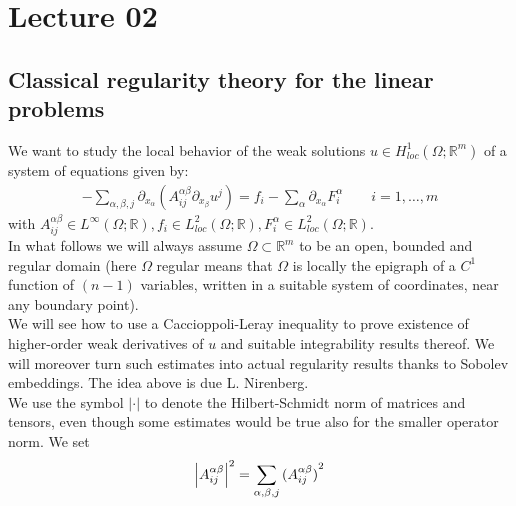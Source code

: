 \chapter{Lecture 02}

\section{Classical regularity theory for the linear problems}
We want to study the local behavior of the weak solutions \(u \in H_{loc}^{1}(\Omega; \mathbb{R}^{m})\) of a system of equations given by:
\begin{gather}
	- \sum_{\alpha, \beta, j} \partial_{x_\alpha} (A_{ij}^{\alpha \beta} \partial_{x_{\beta}} u^{j}) = f_{i} - \sum_{\alpha}^{} \partial_{x_{\alpha}} F_{i}^{\alpha}\qquad i=1,\dots,m
\end{gather}
with \(A_{ij}^{\alpha \beta} \in L^{\infty}(\Omega;\mathbb{R}), f_{i}\in L^{2}_{loc}(\Omega;\mathbb{R}), F_{i}^{\alpha}\in L_{loc}^{2}(\Omega;\mathbb{R})\).\\
In what follows we will always assume \(\Omega \subset \mathbb{R}^{m}\) to be an open, bounded and regular domain (here \(\Omega \) regular means that \(\Omega \) is locally the epigraph of a \(C^{1}\) function of \((n-1)\) variables, written in a suitable system of coordinates, near any boundary point).\\
We will see how to use a Caccioppoli-Leray inequality to prove existence of higher-order weak derivatives of \(u\) and suitable integrability results thereof. We will moreover turn such estimates into actual regularity results thanks to Sobolev embeddings. The idea above is due L. Nirenberg.\\
We use the symbol \(\vert \cdot \vert \) to denote the Hilbert-Schmidt norm of matrices and tensors, even though some estimates would be true also for the smaller operator norm.
We set
\begin{gather}
	\left\lvert A_{ij}^{\alpha \beta}\right\rvert^{2} = \sum_{\alpha, \beta, j}  {(A_{ij}^{\alpha \beta})}^{2}
\end{gather}

